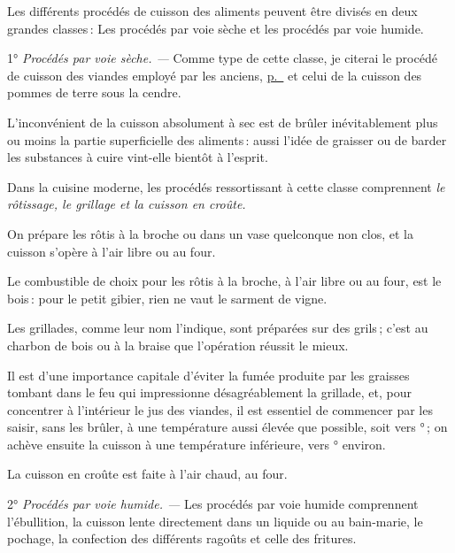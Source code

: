  
\sk

Les différents procédés de cuisson des aliments peuvent être divisés en deux
grandes classes : Les procédés par voie sèche et les procédés par voie humide.

1° \textit{Procédés par voie sèche. —} Comme type de cette classe, je citerai
le procédé de cuisson des viandes employé par les anciens,
\hyperlink{p0013}{p. \pageref{pg0013}} et celui de la cuisson des pommes de terre
sous la cendre.

L'inconvénient de la cuisson absolument à sec est de brûler inévitablement plus
ou moins la partie superficielle des aliments : aussi l'idée de graisser ou de
barder les substances à cuire vint-elle bientôt à l'esprit.

Dans la cuisine moderne, les procédés ressortissant à cette classe comprennent
\textit{le rôtissage, le grillage et la cuisson en croûte.}

On prépare les rôtis à la broche ou dans un vase quelconque non clos, et la
cuisson s'opère à l'air libre ou au four.

Le combustible de choix pour les rôtis à la broche, à l'air libre ou au four,
est le bois : pour le petit gibier, rien ne vaut le sarment de vigne.

Les grillades, comme leur nom l'indique, sont préparées sur des grils ; c'est au
charbon de bois ou à la braise que l'opération réussit le mieux.

Il est d’une importance capitale d'éviter la fumée produite par les graisses
tombant dans le feu qui impressionne désagréablement la grillade, et, pour
concentrer à l'intérieur le jus des viandes, il est essentiel de commencer par
les saisir, sans les brûler, à une température aussi élevée que possible, soit
vers {\mmm}° ; on achève ensuite la cuisson à une température
inférieure, vers {\mmm}° environ.

La cuisson en croûte est faite à l'air chaud, au four.

2° \textit{Procédés par voie humide. —} Les procédés par voie humide
comprennent l'ébullition, la cuisson lente directement dans un liquide ou au
bain-marie, le pochage, la confection des différents ragoûts et celle des
fritures.


